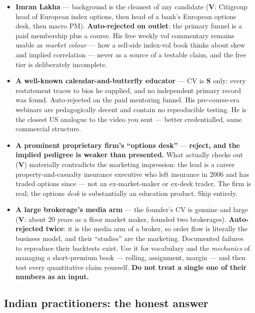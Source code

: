 \documentclass[11pt,a4paper]{article}
\begin{document}
\begin{itemize}
\item \textbf{Imran Lakha} --- background is the cleanest of any candidate
(\textbf{V}: Citigroup head of European index options, then head of a bank's
European options desk, then macro PM). \textbf{Auto-rejected on outlet}: the
primary funnel is a paid membership plus a course. His free weekly vol commentary
remains usable as \emph{market colour} --- how a sell-side index-vol book thinks
about skew and implied correlation --- never as a source of a testable claim, and
the free tier is deliberately incomplete.
\item \textbf{A well-known calendar-and-butterfly educator} --- CV is
\textbf{S} only: every restatement traces to bios he supplied, and no independent
primary record was found. Auto-rejected on the paid mentoring funnel. His
pre-course-era webinars are pedagogically decent and contain no reproducible
testing. He is the closest US analogue to the video you sent --- better
credentialled, same commercial structure.
\item \textbf{A prominent proprietary firm's ``options desk''} --- \textbf{reject,
and the implied pedigree is weaker than presented.} What actually checks out
(\textbf{V}) materially contradicts the marketing impression: the lead is a career
property-and-casualty insurance executive who left insurance in 2006 and has traded
options since --- not an ex-market-maker or ex-desk trader. The firm is real; the
options \emph{desk} is substantially an education product. Skip entirely.
\item \textbf{A large brokerage's media arm} --- the founder's CV is genuine and
large (\textbf{V}: about 20 years as a floor market maker, founded two brokerages).
\textbf{Auto-rejected twice}: it is the media arm of a broker, so order flow is
literally the business model, and their ``studies'' are the marketing. Documented
failures to reproduce their backtests exist. Use it for vocabulary and the
\emph{mechanics} of managing a short-premium book --- rolling, assignment, margin
--- and then test every quantitative claim yourself. \textbf{Do not treat a single
one of their numbers as an input.}
\end{itemize}

\subsection{Indian practitioners: the honest answer}
\end{document}
